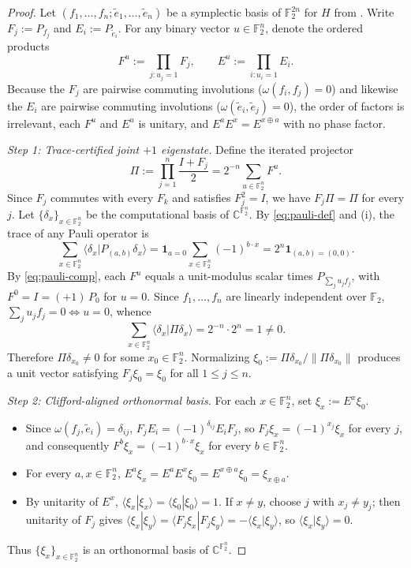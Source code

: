 \documentclass[11pt,a4paper]{article}
\theoremstyle{plain}
\theoremstyle{definition}
\theoremstyle{remark}
\newcommand{\C}{\mathbb{C}}
\newcommand{\F}{\mathbb{F}}
\newcommand{\braket}[2]{\langle#1|#2\rangle}
\newcommand{\norm}[1]{\lVert#1\rVert}
\newcommand{\indic}[1]{\mathbf{1}_{#1}}
\numberwithin{equation}{section}
\begin{document}
\begin{proof}
Let $(f_1, \dots, f_n; \tilde{e}_1, \dots, \tilde{e}_n)$ be a symplectic basis of $\F_2^{2n}$ for $H$ from . Write $F_j := P_{f_j}$ and $E_i := P_{\tilde{e}_i}$. For any binary vector $u \in \F_2^n$, denote the ordered products
\[
  F^u := \prod_{j : u_j = 1} F_j, \qquad E^u := \prod_{i : u_i = 1} E_i.
\]
Because the $F_j$ are pairwise commuting involutions ($\omega(f_i, f_j) = 0$) and likewise the $E_i$ are pairwise commuting involutions ($\omega(\tilde{e}_i, \tilde{e}_j) = 0$), the order of factors is irrelevant, each $F^u$ and $E^u$ is unitary, and $E^a E^x = E^{x \oplus a}$ with no phase factor.

\emph{Step 1: Trace-certified joint $+1$ eigenstate.}
Define the iterated projector
\[
  \Pi := \prod_{j=1}^n \frac{I + F_j}{2} = 2^{-n} \sum_{u \in \F_2^n} F^u.
\]
Since $F_j$ commutes with every $F_k$ and satisfies $F_j^2 = I$, we have $F_j \Pi = \Pi$ for every $j$. Let $\{\delta_x\}_{x \in \F_2^n}$ be the computational basis of $\C^{\F_2^n}$. By \eqref{eq:pauli-def} and (i), the trace of any Pauli operator is
\[
  \sum_{x \in \F_2^n} \braket{\delta_x}{P_{(a,b)}\delta_x} = \indic{a = 0}\sum_{x \in \F_2^n} (-1)^{b \cdot x} = 2^n \indic{(a,b) = (0,0)}.
\]
By \eqref{eq:pauli-comp}, each $F^u$ equals a unit-modulus scalar times $P_{\sum_j u_j f_j}$, with $F^0 = I = (+1)\,P_0$ for $u = 0$. Since $f_1, \dots, f_n$ are linearly independent over $\F_2$, $\sum_j u_j f_j = 0 \iff u = 0$, whence
\[
  \sum_{x \in \F_2^n} \braket{\delta_x}{\Pi \delta_x} = 2^{-n} \cdot 2^n = 1 \neq 0.
\]
Therefore $\Pi \delta_{x_0} \neq 0$ for some $x_0 \in \F_2^n$. Normalizing $\xi_0 := \Pi \delta_{x_0} / \norm{\Pi \delta_{x_0}}$ produces a unit vector satisfying $F_j \xi_0 = \xi_0$ for all $1 \le j \le n$.

\emph{Step 2: Clifford-aligned orthonormal basis.}
For each $x \in \F_2^n$, set $\xi_x := E^x \xi_0$.
\begin{itemize}[leftmargin=1.8em]
  \item Since $\omega(f_j, \tilde{e}_i) = \delta_{ij}$, $F_j E_i = (-1)^{\delta_{ij}} E_i F_j$, so $F_j \xi_x = (-1)^{x_j} \xi_x$ for every $j$, and consequently $F^b \xi_x = (-1)^{b \cdot x} \xi_x$ for every $b \in \F_2^n$.
  \item For every $a, x \in \F_2^n$, $E^a \xi_x = E^a E^x \xi_0 = E^{x \oplus a} \xi_0 = \xi_{x \oplus a}$.
  \item By unitarity of $E^x$, $\braket{\xi_x}{\xi_x} = \braket{\xi_0}{\xi_0} = 1$. If $x \neq y$, choose $j$ with $x_j \neq y_j$; then unitarity of $F_j$ gives $\braket{\xi_x}{\xi_y} = \braket{F_j \xi_x}{F_j \xi_y} = -\braket{\xi_x}{\xi_y}$, so $\braket{\xi_x}{\xi_y} = 0$.
\end{itemize}
Thus $\{\xi_x\}_{x \in \F_2^n}$ is an orthonormal basis of $\C^{\F_2^n}$.


\end{proof}
\end{document}

